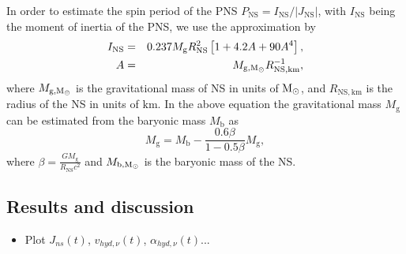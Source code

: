 \documentclass[fleqn,usenatbib]{mnras}
\newcommand{\solm}{\ensuremath{\rm{M_{\odot}}}\xspace}
\newcommand{\km}{\ensuremath{\mathrm{km}}}
\begin{document}
In order to estimate the spin period of the PNS $P_{\mathrm{NS}}=I_{\mathrm{NS}}/|J_{\mathrm{NS}}|$, with $I_{\mathrm{NS}}$ being the moment of inertia of the PNS, we use the approximation by \citet{Lattimer2004}
\begin{eqnarray}
    I_{\mathrm{NS}} &=& 0.237M_{\mathrm{g}}R_{\text{NS}}^2\left[1 + 4.2 A  + 90 A^4\right],\\
    A &=&  M_{\text{g},\solm}R_{\text{NS},\km}^{-1},\nonumber
    \label{equ: ins}
\end{eqnarray}
where $M_{\text{g},\solm}$ is the gravitational mass of NS in units of $\solm$, and $R_{\text{NS},\km}$ is the radius of the NS in units of $\km$.
In the above equation the gravitational mass $M_{\mathrm{g}}$ can be estimated from the baryonic mass $M_{\mathrm{b}}$  as \citep{Lattimer2000}
\begin{equation}
    M_{\mathrm{g}} = M_{\mathrm{b}} - \frac{0.6 \beta}{1-0.5\beta}  M_{\mathrm{g}}, 
\end{equation}
where $\beta=\frac{GM_{\mathrm{g}}}{R_{\mathrm{NS}}c^2}$ and
$M_{\text{b},\solm}$ is the baryonic mass of the NS.


\subsection{Results and discussion}
\begin{itemize}
    \item Plot $J_{ns}(t)$, $v_{hyd,\nu}(t)$, $\alpha_{hyd,\nu}(t)$...
\end{itemize}


\newpage

\label{lastpage}
\end{document}
